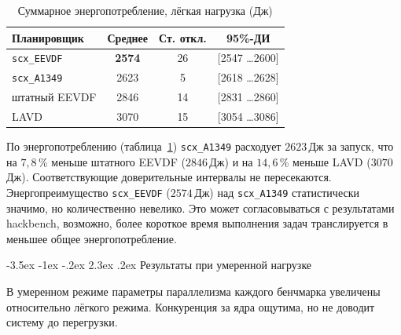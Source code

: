 \documentclass[14pt, oneside]{extbook}
\makeatletter
\renewcommand\section{\@startsection {section}{1}{\z@}%
                                   {-3.5ex \@plus -1ex \@minus -.2ex}%
                                   {2.3ex \@plus.2ex}%
                                   {\normalfont\fontsize{16}{20}\selectfont\bfseries}}
\makeatother
\begin{document}
        \begin{table}[H]
                \centering
                \caption{Суммарное энергопотребление, лёгкая нагрузка (Дж)}
                \label{tab:light_energy}
                \vspace{0.4em}
                \begin{tabular}{|l|c|c|c|}
                        \hline
                        Планировщик & Среднее & Ст. откл. & 95\%-ДИ \\
                        \hline
                        \texttt{scx\_EEVDF} & \textbf{2574} & 26 & [2547 \dots 2600] \\
                        \texttt{scx\_A1349} & 2623 & 5 & [2618 \dots 2628] \\
                        штатный EEVDF & 2846 & 14 & [2831 \dots 2860] \\
                        LAVD & 3070 & 15 & [3054 \dots 3086] \\
                        \hline
                \end{tabular}
        \end{table}

        По энергопотреблению (таблица~\ref{tab:light_energy})
        \texttt{scx\_A1349} расходует $2623$\,Дж за запуск, что
        на $7{,}8$\,\% меньше штатного EEVDF ($2846$\,Дж) и на
        $14{,}6$\,\% меньше LAVD ($3070$\,Дж). Соответствующие
        доверительные интервалы не пересекаются.
        Энергопреимущество \texttt{scx\_EEVDF} ($2574$\,Дж) над
        \texttt{scx\_A1349} статистически значимо, но
        количественно невелико. Это может согласовываться с
        результатами hackbench, возможно, более короткое время
        выполнения задач транслируется в меньшее общее
        энергопотребление.


\section{Результаты при умеренной нагрузке}

        В умеренном режиме параметры параллелизма каждого
        бенчмарка увеличены относительно лёгкого режима.
        Конкуренция за ядра ощутима, но не доводит систему
        до перегрузки.
\end{document}
